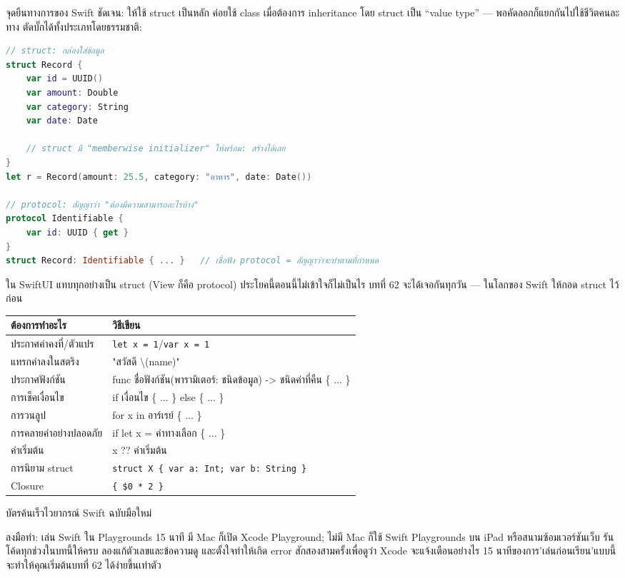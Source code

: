 
จุดยืนทางการของ Swift ชัดเจน: ให้ใช้ struct เป็นหลัก ค่อยใช้ class เมื่อต้องการ inheritance โดย struct เป็น “value type” — พอคัดลอกก็แยกกันไปใช้ชีวิตคนละทาง ตัดบั๊กได้ทั้งประเภทโดยธรรมชาติ:

\begin{lstlisting}[language=Swift]
// struct: กล่องใส่ข้อมูล
struct Record {
    var id = UUID()
    var amount: Double
    var category: String
    var date: Date

    // struct มี "memberwise initializer" ให้พร้อม: สร้างได้เลย
}
let r = Record(amount: 25.5, category: "อาหาร", date: Date())

// protocol: สัญญาว่า "ต้องมีความสามารถอะไรบ้าง"
protocol Identifiable {
    var id: UUID { get }
}
struct Record: Identifiable { ... }   // เชื่อฟัง protocol = สัญญาว่าจะทำตามที่กำหนด
\end{lstlisting}

ใน SwiftUI แทบทุกอย่างเป็น struct (View ก็คือ protocol) ประโยคนี้ตอนนี้ไม่เข้าใจก็ไม่เป็นไร บทที่ 62 จะได้เจอกันทุกวัน — ในโลกของ Swift ให้กอด struct ไว้ก่อน


\begin{center}
\begin{tabularx}{\linewidth}{|X|X|}
\hline
\textbf{ต้องการทำอะไร} & \textbf{วิธีเขียน} \tabularnewline
\hline
ประกาศค่าคงที่/ตัวแปร & \texttt{let x = 1}/\texttt{var x = 1} \tabularnewline
แทรกค่าลงในสตริง & "สวัสดี \textbackslash{}(name)" \tabularnewline
ประกาศฟังก์ชัน & func ชื่อฟังก์ชัน(พารามิเตอร์: ชนิดข้อมูล) -> ชนิดค่าที่คืน \{ ... \} \tabularnewline
การเช็คเงื่อนไข & if เงื่อนไข \{ ... \} else \{ ... \} \tabularnewline
การวนลูป & for x in อาร์เรย์ \{ ... \} \tabularnewline
การคลายค่าอย่างปลอดภัย & if let x = ค่าทางเลือก \{ ... \} \tabularnewline
ค่าเริ่มต้น & x ?? ค่าเริ่มต้น \tabularnewline
การนิยาม struct & \texttt{struct X \{ var a: Int; var b: String \}} \tabularnewline
Closure & \texttt{\{ \$0 * 2 \}} \tabularnewline
\hline
\end{tabularx}
\end{center}

\begin{center}\small\color{gray}บัตรค้นเร็วไวยากรณ์ Swift ฉบับมือใหม่\end{center}

\begin{tcbpractice}{ลงมือทำ: เล่น Swift ใน Playgrounds 15 นาที}
มี Mac ก็เปิด Xcode Playground; ไม่มี Mac ก็ใช้ Swift Playgrounds บน iPad หรือสนามซ้อมเวอร์ชันเว็บ รันโค้ดทุกช่วงในบทนี้ให้ครบ ลองแก้ตัวเลขและข้อความดู และตั้งใจทำให้เกิด error สักสองสามครั้งเพื่อดูว่า Xcode จะแจ้งเตือนอย่างไร 15 นาทีของการ'เล่นก่อนเรียน'แบบนี้ จะทำให้คุณเริ่มต้นบทที่ 62 ได้ง่ายขึ้นเท่าตัว

\end{tcbpractice}


